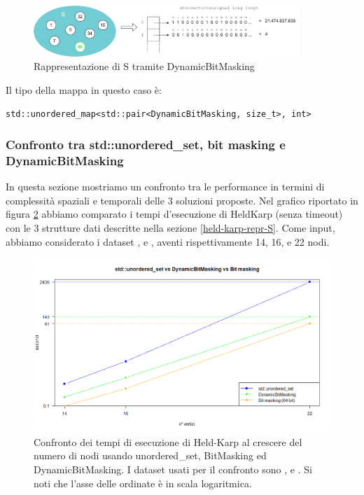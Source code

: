 \begin{figure}[h]
	\centering
	\includegraphics[width=0.9\textwidth]{./images/BitMaskingExtended Example.png}
	\caption{Rappresentazione di S tramite DynamicBitMasking}
	\label{fig:DynamicBitMasking-example}
\end{figure}

\noindent Il tipo della mappa in questo caso è:

\begin{center}
    \texttt{std::unordered_map<std::pair<DynamicBitMasking, size_t>, int>}
\end{center}

\subsubsection{Confronto tra std::unordered\_set, bit masking e DynamicBitMasking}

In questa sezione mostriamo un confronto tra le performance in termini di complessità spaziali e temporali delle 3 soluzioni proposte. Nel grafico riportato in figura \ref{fig:UnorderedvsDynamicBitMasking} abbiamo comparato i tempi d'esecuzione di HeldKarp (senza timeout) con le 3 strutture dati descritte nella sezione \ref{held-karp-repr-S}.
Come input, abbiamo considerato i dataset ,  e , aventi rispettivamente 14, 16, e 22 nodi.

\begin{figure}[h]
	\centering
	\includegraphics[width=1\textwidth]{./images/unorderedSet vs BitMasking.png}
	\caption{Confronto dei tempi di esecuzione di Held-Karp al crescere del numero di nodi usando unordered\_set, BitMasking ed DynamicBitMasking. I dataset usati per il confronto sono ,  e . Si noti che l'asse delle ordinate è in scala logaritmica.}
	\label{fig:UnorderedvsDynamicBitMasking}
\end{figure}

